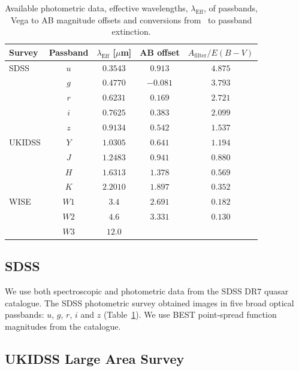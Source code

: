 \begin{table}
  \footnotesize
  \centering
  \begin{tabular}{lcccc}
    \hline 
    Survey & Passband & $\lambda_{\text{Eff}}$ [$\mu$m] & AB offset & $A_{\text{filter}}/E(B-V)$ \\
    \hline 
    SDSS & $u$ & $0.3543$ & $ 0.913$ & $4.875$ \\
         & $g$ & $0.4770$ & $-0.081$ & $3.793$ \\
         & $r$ & $0.6231$ & $ 0.169$ & $2.721$ \\
         & $i$ & $0.7625$ & $ 0.383$ & $2.099$ \\
         & $z$ & $0.9134$ & $ 0.542$ & $1.537$ \\
    UKIDSS & $Y$ & $1.0305$ &  $0.641$ & $1.194$ \\
           & $J$ & $1.2483$ &  $0.941$ & $0.880$ \\
           & $H$ & $1.6313$ &  $1.378$ & $0.569$ \\
           & $K$ & $2.2010$ &  $1.897$ & $0.352$ \\
    WISE & $W1$ & $3.4$ & $2.691$ & $0.182$\\
         & $W2$ & $4.6$ & $3.331$ & $0.130$\\
         & $W3$ & $12.0$ & & \\           
    \hline
  \end{tabular}
  \caption[{Available photometry, effective wavelengths $\lambda_{\text{Eff}}$ of passbands, Vega to AB magnitude offsets and conversions from \ebv to passband extinction.}]{Available photometric data, effective wavelengths, $\lambda_{\text{Eff}}$, of passbands, Vega to AB magnitude offsets and conversions from \ebv\, to passband extinction. }
  \label{tab:photometry}
\end{table}

\subsection{SDSS}

We use both spectroscopic and photometric data from the SDSS DR$7$ quasar catalogue.
The SDSS photometric survey obtained images in five broad optical passbands: $u$, $g$, $r$, $i$ and $z$ (Table~\ref{tab:photometry}).  
We use BEST point-spread function magnitudes from the catalogue.

\subsection{UKIDSS Large Area Survey}

